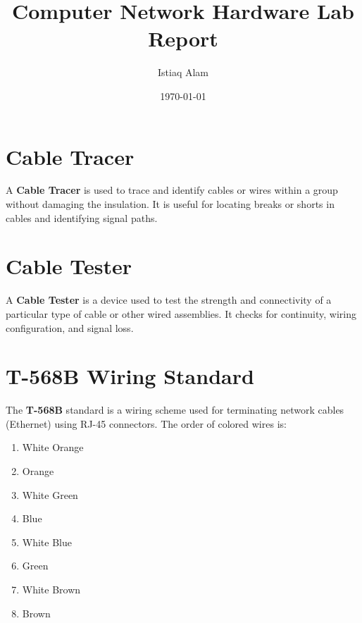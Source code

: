 \documentclass[12pt]{article}
\title{Computer Network Hardware Lab Report}
\author{Istiaq Alam}
\date{\today}
\begin{document}
\maketitle
\tableofcontents
\newpage

\section{Cable Tracer}
A \textbf{Cable Tracer} is used to trace and identify cables or wires within a group without damaging the insulation. It is useful for locating breaks or shorts in cables and identifying signal paths.

\begin{center}
\end{center}

\section{Cable Tester}
A \textbf{Cable Tester} is a device used to test the strength and connectivity of a particular type of cable or other wired assemblies. It checks for continuity, wiring configuration, and signal loss.

\begin{center}
\end{center}

\section{T-568B Wiring Standard}
The \textbf{T-568B} standard is a wiring scheme used for terminating network cables (Ethernet) using RJ-45 connectors. The order of colored wires is:
\begin{enumerate}
\item White Orange
\item Orange
\item White Green
\item Blue
\item White Blue
\item Green
\item White Brown
\item Brown
\end{enumerate}
\end{document}
